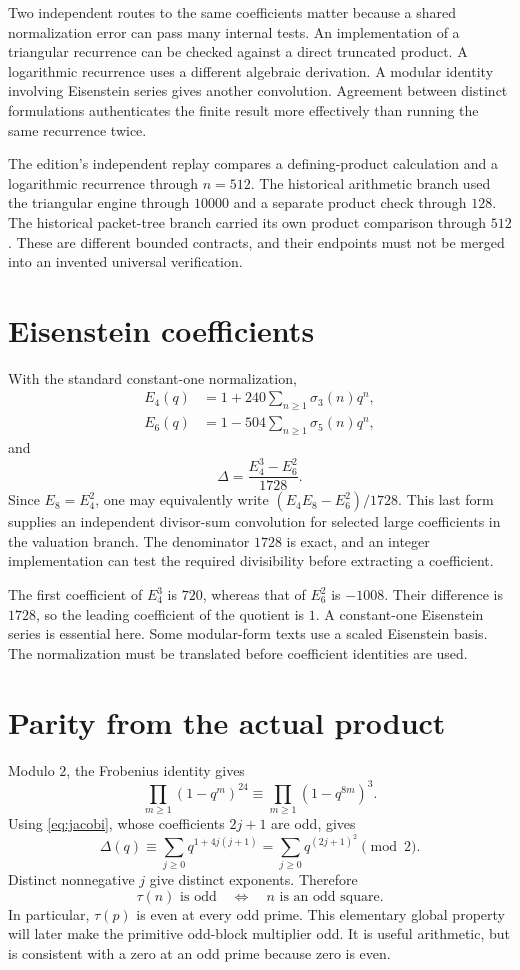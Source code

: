 Two independent routes to the same coefficients matter because a shared normalization error can pass many internal tests. An implementation of a triangular recurrence can be checked against a direct truncated product. A logarithmic recurrence uses a different algebraic derivation. A modular identity involving Eisenstein series gives another convolution. Agreement between distinct formulations authenticates the finite result more effectively than running the same recurrence twice.

The edition's independent replay compares a defining-product calculation and a logarithmic recurrence through $n=512$. The historical arithmetic branch used the triangular engine through $10000$ and a separate product check through $128$. The historical packet-tree branch carried its own product comparison through $512$. These are different bounded contracts, and their endpoints must not be merged into an invented universal verification.

\section{Eisenstein coefficients}
With the standard constant-one normalization,
\begin{align}
E_4(q)&=1+240\sum_{n\ge1}\sigma_3(n)q^n,\\
E_6(q)&=1-504\sum_{n\ge1}\sigma_5(n)q^n,
\end{align}
and
\begin{equation}\label{eq:deltaeisen}
\Delta=\frac{E_4^3-E_6^2}{1728}.
\end{equation}
Since $E_8=E_4^2$, one may equivalently write $(E_4E_8-E_6^2)/1728$. This last form supplies an independent divisor-sum convolution for selected large coefficients in the valuation branch. The denominator $1728$ is exact, and an integer implementation can test the required divisibility before extracting a coefficient.

The first coefficient of $E_4^3$ is $720$, whereas that of $E_6^2$ is $-1008$. Their difference is $1728$, so the leading coefficient of the quotient is $1$. A constant-one Eisenstein series is essential here. Some modular-form texts use a scaled Eisenstein basis. The normalization must be translated before coefficient identities are used.

\section{Parity from the actual product}
Modulo $2$, the Frobenius identity gives
\[
\prod_{m\ge1}(1-q^m)^{24}
\equiv\prod_{m\ge1}(1-q^{8m})^3.
\]
Using \eqref{eq:jacobi}, whose coefficients $2j+1$ are odd, gives
\[
\Delta(q)\equiv\sum_{j\ge0}q^{1+4j(j+1)}
=\sum_{j\ge0}q^{(2j+1)^2}\pmod2.
\]
Distinct nonnegative $j$ give distinct exponents. Therefore
\begin{equation}\label{eq:parity}
\tau(n)\text{ is odd}\quad\Longleftrightarrow\quad n\text{ is an odd square}.
\end{equation}
In particular, $\tau(p)$ is even at every odd prime. This elementary global property will later make the primitive odd-block multiplier odd. It is useful arithmetic, but is consistent with a zero at an odd prime because zero is even.


